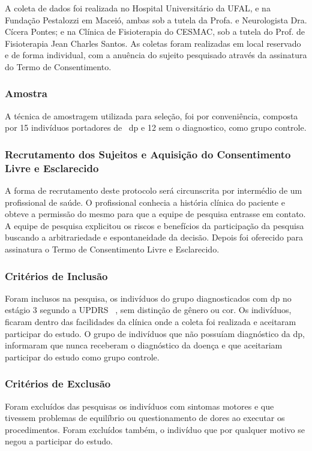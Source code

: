 A coleta de dados foi realizada no Hospital Universitário da UFAL, e na Fundação Pestalozzi em Maceió, ambas sob a tutela da Profa. e Neurologista Dra. Cícera Pontes; e na Clínica de Fisioterapia do CESMAC, sob a tutela do Prof. de Fisioterapia Jean Charles Santos. As coletas foram realizadas em local reservado e de forma individual, com a anuência do sujeito pesquisado através da assinatura do Termo de Consentimento.

\subsubsection{Amostra}
A técnica de amostragem utilizada para seleção, foi por conveniência, composta por 15 indivíduos portadores de ~\ac{dp} e 12 sem o diagnostico, como grupo controle.

\subsubsection{Recrutamento dos Sujeitos e Aquisição do Consentimento Livre e Esclarecido}
A forma de recrutamento deste protocolo será circunscrita por intermédio de um profissional de saúde. O profissional conhecia a história clínica do paciente e obteve a permissão do mesmo para que a equipe de pesquisa entrasse em contato. A equipe de pesquisa explicitou os riscos e benefícios da participação da pesquisa buscando a arbitrariedade e espontaneidade da decisão. Depois foi oferecido para assinatura o Termo de Consentimento Livre e Esclarecido.

\subsubsection{Critérios de Inclusão}
Foram inclusos na pesquisa, os indivíduos do grupo diagnosticados com \ac{dp} no estágio 3 segundo a UPDRS ~\cite{updrs87}, sem distinção de gênero ou cor. Os indivíduos, ficaram dentro das facilidades da clínica onde a coleta foi realizada e aceitaram participar do estudo. O grupo de indivíduos que não possuíam diagnóstico da \ac{dp}, informaram que nunca receberam o diagnóstico da doença e que aceitariam participar do estudo como grupo controle.

\subsubsection{Critérios de Exclusão}
Foram excluídos das pesquisas os indivíduos com sintomas motores e que tivessem problemas de equilíbrio ou questionamento de dores ao executar os procedimentos. Foram excluídos também, o indivíduo que por qualquer motivo se negou a participar do estudo.

